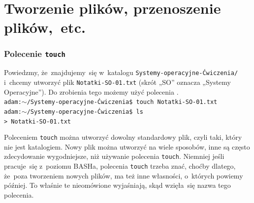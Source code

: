 \documentclass[10pt,t]{beamer}
\begin{document}
\section{Tworzenie plików, przenoszenie plików,~etc.}


\begin{frame}
  \frametitle{Polecenie \texttt{touch}}


  Powiedzmy, że~znajdujemy~się w~katalogu
  \texttt{Systemy-operacyjne-Ćwiczenia/} i~chcemy utworzyć plik
  \texttt{Notatki-SO-01.txt} (skrót „SO” oznacza „Systemy Operacyjne”).
  Do zrobienia tego możemy użyć polecenia
  . \\
  \texttt{adam:$\sim$/Systemy-operacyjne-Ćwiczenia\$ touch
    Notatki-SO-01.txt} \\
  \texttt{adam:$\sim$/Systemy-operacyjne-Ćwiczenia\$ ls} \\
  \texttt{> Notatki-SO-01.txt} \quad
  \texttt{}

  Poleceniem \texttt{touch} można utworzyć dowolny standardowy plik, czyli
  taki, który nie jest katalogiem. Nowy plik można utworzyć na wiele
  sposobów, inne są często zdecydowanie wygodniejsze, niż używanie
  polecenia \texttt{touch}. Niemniej jeśli pracuje~się z~poziomu BASHa,
  polecenia \texttt{touch} trzeba znać, choćby dlatego, że~poza tworzeniem
  nowych plików, ma też inne własności, o~których powiemy później. To
  właśnie te nieomówione wyjaśniają, skąd wzięła~się nazwa tego polecenia.

\end{frame}
\end{document}
